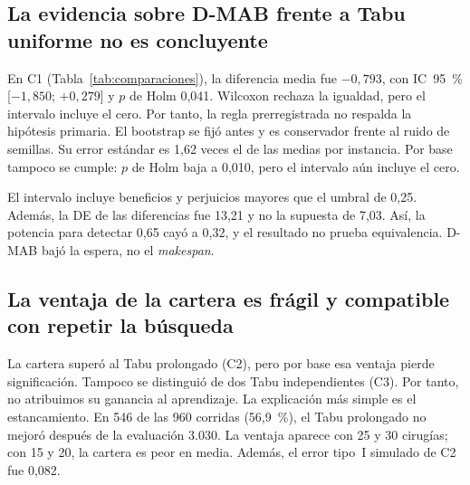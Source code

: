 \subsection{La evidencia sobre D-MAB frente a Tabu uniforme no es concluyente}
\label{subsec:c1}
En C1 (Tabla~\ref{tab:comparaciones}), la diferencia media fue $-0{,}793$, con
IC~95~\% [$-1{,}850$; $+0{,}279$] y $p$ de Holm 0,041.
Wilcoxon rechaza la igualdad, pero el intervalo incluye el cero. Por tanto, la regla
prerregistrada no respalda la hipótesis primaria. El bootstrap se fijó antes y es
conservador frente al ruido de semillas. Su error estándar es 1,62 veces el de las
medias por instancia.
Por base tampoco se cumple: $p$ de Holm baja a 0,010, pero el intervalo aún incluye el cero.

El intervalo incluye beneficios y perjuicios mayores que el umbral de 0,25. Además,
la DE de las diferencias fue 13,21 y no la supuesta de 7,03. Así, la potencia para
detectar 0,65 cayó a 0,32, y el resultado no prueba equivalencia.
D-MAB bajó la espera, no el \emph{makespan}.

\begin{table}[!ht]
 \centering
 \caption{Diferencias de $f$ (semillas 90--109, 960 pares); negativo favorece a la alternativa. Negrita: cumple los tres criterios en el sentido de su media; solo obligaban en C1. Por base, ninguna comparación los cumple. Ese reanálisis, $r$ y las columnas por tamaño (12 instancias cada una) son exploratorios.}
 \label{tab:comparaciones}
 \scriptsize\setlength{\tabcolsep}{2.5pt}
 
\end{table}

\subsection{La ventaja de la cartera es frágil y compatible con repetir la búsqueda}
\label{subsec:cartera}
La cartera superó al Tabu prolongado (C2), pero por base esa ventaja pierde
significación. Tampoco se distinguió de dos Tabu independientes (C3). Por tanto, no
atribuimos su ganancia al aprendizaje. La explicación más simple es el estancamiento.
En 546 de las 960 corridas (56,9~\%), el Tabu prolongado no mejoró después de la
evaluación 3.030.
La ventaja aparece con 25 y 30 cirugías; con 15 y 20, la cartera es peor en media.
Además, el error tipo~I simulado de C2 fue 0,082.

